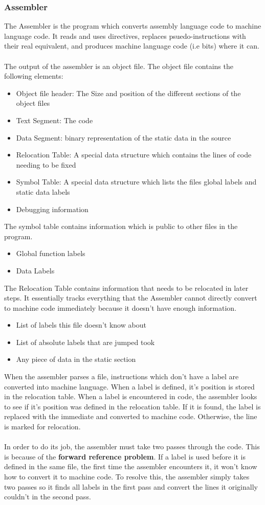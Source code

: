\documentclass{article}
\begin{document}
\subsubsection{Assembler}
The Assembler is the program which converts assembly language code to machine language code. It reads and uses
directives, replaces psuedo-instructions with their real equivalent, and produces machine language code (i.e bits)
where it can.\\\\
The output of the assembler is an object file. The object file contains the following elements:
\begin{itemize}
    \item Object file header: The Size and position of the different sections of the object files
    \item Text Segment: The code
    \item Data Segment: binary representation of the static data in the source
    \item Relocation Table: A special data structure which contains the lines of code needing to be fixed
    \item Symbol Table: A special data structure which lists the files global labels and static data labels
    \item Debugging information
\end{itemize}
The symbol table contains information which is public to other files in the program.
\begin{itemize}
    \item Global function labels
    \item Data Labels
\end{itemize}
The Relocation Table contains information that needs to be relocated in later steps. It essentially tracks
everything that the Assembler cannot directly convert to machine code immediately because it doesn't have
enough information.
\begin{itemize}
    \item List of labels this file doesn't know about
    \item List of absolute labels that are jumped took
    \item Any piece of data in the static section
\end{itemize}
When the assembler parses a file, instructions which don't have a label are converted into machine language. When a label is defined,
it's position is stored in the relocation table. When a label is encountered in code, the assembler looks to see if it's position
was defined in the relocation table. If it is found, the label is replaced with the immediate and converted to machine code.
Otherwise, the line is marked for relocation.\\\\
In order to do its job, the assembler must take two passes through the code. This is because of the \textbf{forward reference problem}.
If a label is used before it is defined in the same file, the first time the assembler encounters it, it won't know how to convert it to machine code.
To resolve this, the assembler simply takes two passes so it finds all labels in the first pass and convert the lines it originally couldn't in the second pass.
\end{document}
